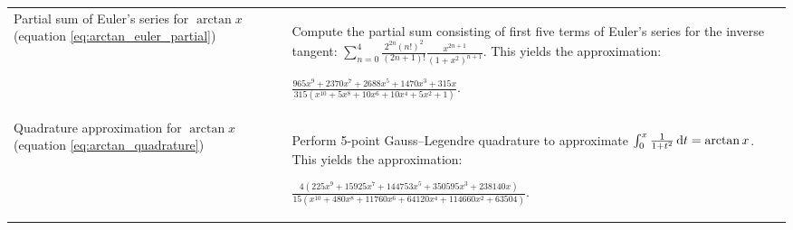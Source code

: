 \begin{table*}[ht]
\begin{tabular}{
        p{}
        p{}}
            Partial sum of Euler's series for $\arctan{x}$ (equation \ref{eq:arctan_euler_partial})
            & Compute the partial sum consisting of first five terms of Euler's series for the inverse tangent:
            $\sum_{n=0}^{4}
            {
            \frac
                {2^{2n}(n!)^2}
                {(2n+1)!}
            \frac
                {x^{2n+1}}
                {(1+x^2)^{n+1}}
            }$. This yields the approximation:
            \begin{center}
                $\displaystyle 
                \frac
                {965x^9 + 2370x^7 + 2688x^5 + 1470x^3 + 315x}
                {315\left(x^{10} + 5x^8 + 10x^6 + 10x^4 + 5x^2 + 1\right)}$.
            \end{center}
            \\[10pt]
            
            Quadrature approximation for $\arctan{x}$ (equation \ref{eq:arctan_quadrature})
            & Perform 5-point Gauss--Legendre quadrature to approximate $\int_0^x{\frac{1}{1+t^2}\mathop{}\!\mathrm{d} t} = \arctan{x}$. This yields the approximation:
            \begin{center}
                $\displaystyle
            \frac
            {4\left(225x^9 + 15925x^7 + 144753x^5 + 350595x^3 + 238140x\right)}
            {15\left(x^{10} + 480x^8 + 11760x^6 + 64120x^4 + 114660x^2 + 63504\right)}$.
            \end{center}
            \\
	    \bottomrule
    \end{tabular}
\end{table*}